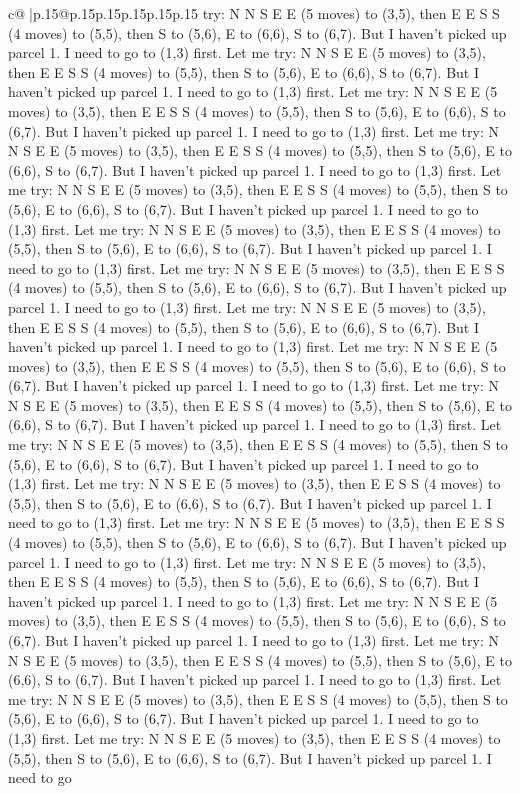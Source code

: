 \documentclass{article}
\begin{document}
{\begin{supertabular}{c@{$\;$}|p{.15\linewidth}@{}p{.15\linewidth}p{.15\linewidth}p{.15\linewidth}p{.15\linewidth}p{.15\linewidth}}
{{{try: N N S E E (5 moves) to (3,5), then E E S S (4 moves) to (5,5), then S to (5,6), E to (6,6), S to (6,7). But I haven't picked up parcel 1. I need to go to (1,3) first. Let me try: N N S E E (5 moves) to (3,5), then E E S S (4 moves) to (5,5), then S to (5,6), E to (6,6), S to (6,7). But I haven't picked up parcel 1. I need to go to (1,3) first. Let me try: N N S E E (5 moves) to (3,5), then E E S S (4 moves) to (5,5), then S to (5,6), E to (6,6), S to (6,7). But I haven't picked up parcel 1. I need to go to (1,3) first. Let me try: N N S E E (5 moves) to (3,5), then E E S S (4 moves) to (5,5), then S to (5,6), E to (6,6), S to (6,7). But I haven't picked up parcel 1. I need to go to (1,3) first. Let me try: N N S E E (5 moves) to (3,5), then E E S S (4 moves) to (5,5), then S to (5,6), E to (6,6), S to (6,7). But I haven't picked up parcel 1. I need to go to (1,3) first. Let me try: N N S E E (5 moves) to (3,5), then E E S S (4 moves) to (5,5), then S to (5,6), E to (6,6), S to (6,7). But I haven't picked up parcel 1. I need to go to (1,3) first. Let me try: N N S E E (5 moves) to (3,5), then E E S S (4 moves) to (5,5), then S to (5,6), E to (6,6), S to (6,7). But I haven't picked up parcel 1. I need to go to (1,3) first. Let me try: N N S E E (5 moves) to (3,5), then E E S S (4 moves) to (5,5), then S to (5,6), E to (6,6), S to (6,7). But I haven't picked up parcel 1. I need to go to (1,3) first. Let me try: N N S E E (5 moves) to (3,5), then E E S S (4 moves) to (5,5), then S to (5,6), E to (6,6), S to (6,7). But I haven't picked up parcel 1. I need to go to (1,3) first. Let me try: N N S E E (5 moves) to (3,5), then E E S S (4 moves) to (5,5), then S to (5,6), E to (6,6), S to (6,7). But I haven't picked up parcel 1. I need to go to (1,3) first. Let me try: N N S E E (5 moves) to (3,5), then E E S S (4 moves) to (5,5), then S to (5,6), E to (6,6), S to (6,7). But I haven't picked up parcel 1. I need to go to (1,3) first. Let me try: N N S E E (5 moves) to (3,5), then E E S S (4 moves) to (5,5), then S to (5,6), E to (6,6), S to (6,7). But I haven't picked up parcel 1. I need to go to (1,3) first. Let me try: N N S E E (5 moves) to (3,5), then E E S S (4 moves) to (5,5), then S to (5,6), E to (6,6), S to (6,7). But I haven't picked up parcel 1. I need to go to (1,3) first. Let me try: N N S E E (5 moves) to (3,5), then E E S S (4 moves) to (5,5), then S to (5,6), E to (6,6), S to (6,7). But I haven't picked up parcel 1. I need to go to (1,3) first. Let me try: N N S E E (5 moves) to (3,5), then E E S S (4 moves) to (5,5), then S to (5,6), E to (6,6), S to (6,7). But I haven't picked up parcel 1. I need to go to (1,3) first. Let me try: N N S E E (5 moves) to (3,5), then E E S S (4 moves) to (5,5), then S to (5,6), E to (6,6), S to (6,7). But I haven't picked up parcel 1. I need to go to (1,3) first. Let me try: N N S E E (5 moves) to (3,5), then E E S S (4 moves) to (5,5), then S to (5,6), E to (6,6), S to (6,7). But I haven't picked up parcel 1. I need to go to (1,3) first. Let me try: N N S E E (5 moves) to (3,5), then E E S S (4 moves) to (5,5), then S to (5,6), E to (6,6), S to (6,7). But I haven't picked up parcel 1. I need to go }}}
\end{supertabular}}
\end{document}
